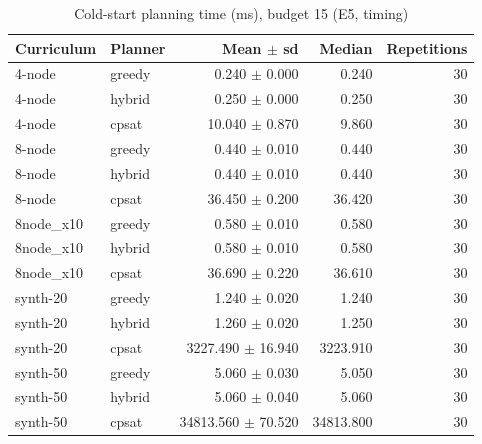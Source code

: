\begin{table}[htbp]
\centering\small
\caption{Cold-start planning time (ms), budget 15 (E5, timing)}
\label{tab:t13}
\begin{tabular}{llrrr}
\toprule
Curriculum & Planner & Mean $\pm$ sd & Median & Repetitions \\
\midrule
4-node & greedy & 0.240 $\pm$ 0.000 & 0.240 & 30 \\
4-node & hybrid & 0.250 $\pm$ 0.000 & 0.250 & 30 \\
4-node & cpsat & 10.040 $\pm$ 0.870 & 9.860 & 30 \\
8-node & greedy & 0.440 $\pm$ 0.010 & 0.440 & 30 \\
8-node & hybrid & 0.440 $\pm$ 0.010 & 0.440 & 30 \\
8-node & cpsat & 36.450 $\pm$ 0.200 & 36.420 & 30 \\
8node\_x10 & greedy & 0.580 $\pm$ 0.010 & 0.580 & 30 \\
8node\_x10 & hybrid & 0.580 $\pm$ 0.010 & 0.580 & 30 \\
8node\_x10 & cpsat & 36.690 $\pm$ 0.220 & 36.610 & 30 \\
synth-20 & greedy & 1.240 $\pm$ 0.020 & 1.240 & 30 \\
synth-20 & hybrid & 1.260 $\pm$ 0.020 & 1.250 & 30 \\
synth-20 & cpsat & 3227.490 $\pm$ 16.940 & 3223.910 & 30 \\
synth-50 & greedy & 5.060 $\pm$ 0.030 & 5.050 & 30 \\
synth-50 & hybrid & 5.060 $\pm$ 0.040 & 5.060 & 30 \\
synth-50 & cpsat & 34813.560 $\pm$ 70.520 & 34813.800 & 30 \\
\bottomrule
\end{tabular}
\end{table}
